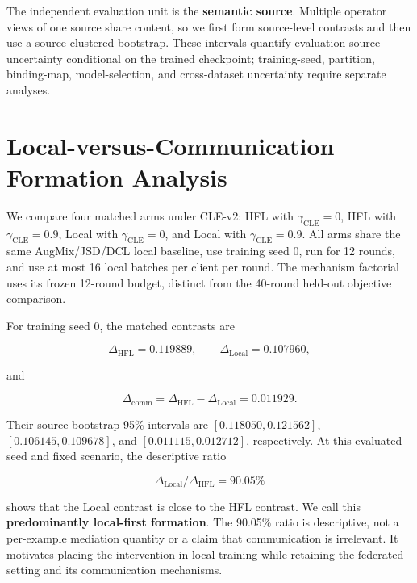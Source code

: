 The independent evaluation unit is the \textbf{semantic source}. Multiple operator views of one source share content, so we first form source-level contrasts and then use a source-clustered bootstrap. These intervals quantify evaluation-source uncertainty conditional on the trained checkpoint; training-seed, partition, binding-map, model-selection, and cross-dataset uncertainty require separate analyses.

\section{Local-versus-Communication Formation Analysis}

We compare four matched arms under CLE-v2: HFL with \(\gamma_{\mathrm{CLE}}=0\), HFL with \(\gamma_{\mathrm{CLE}}=0.9\), Local with \(\gamma_{\mathrm{CLE}}=0\), and Local with \(\gamma_{\mathrm{CLE}}=0.9\). All arms share the same AugMix/JSD/DCL local baseline, use training seed 0, run for 12 rounds, and use at most 16 local batches per client per round. The mechanism factorial uses its frozen 12-round budget, distinct from the 40-round held-out objective comparison.



For training seed 0, the matched contrasts are

\[
\Delta_{\mathrm{HFL}}=0.119889,\qquad
\Delta_{\mathrm{Local}}=0.107960,
\]

and

\[
\Delta_{\mathrm{comm}}
=\Delta_{\mathrm{HFL}}-\Delta_{\mathrm{Local}}
=0.011929.
\]

Their source-bootstrap 95\% intervals are \([0.118050,0.121562]\), \([0.106145,0.109678]\), and \([0.011115,0.012712]\), respectively. At this evaluated seed and fixed scenario, the descriptive ratio

\[
\Delta_{\mathrm{Local}}/\Delta_{\mathrm{HFL}}=90.05\%
\]

shows that the Local contrast is close to the HFL contrast. We call this \textbf{predominantly local-first formation}. The 90.05\% ratio is descriptive, not a per-example mediation quantity or a claim that communication is irrelevant. It motivates placing the intervention in local training while retaining the federated setting and its communication mechanisms.


